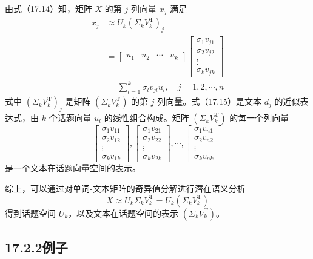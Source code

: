 \documentclass[UTF8,12pt,a4paper,fontset=fandol]{ctexart}
\begin{document}
由式（17.14）知，矩阵 $X$ 的第 $j$ 列向量 $x_j$ 满足
\begin{equation}
\begin{aligned}
x_j&\approx U_k(\Sigma_kV_k^{\mathrm{T}})_j\\
&=
\begin{bmatrix}
u_1 & u_2 & \cdots & u_k
\end{bmatrix}
\begin{bmatrix}
\sigma_1 v_{j1}\\
\sigma_2 v_{j2}\\
\vdots\\
\sigma_k v_{jk}
\end{bmatrix}\\
&=\sum_{l=1}^k \sigma_l v_{jl}u_l,\quad j=1,2,\cdots,n
\end{aligned}
\tag{17.15}
\end{equation}
式中 $(\Sigma_kV_k^{\mathrm{T}})_j$ 是矩阵 $(\Sigma_kV_k^{\mathrm{T}})$ 的第 $j$ 列向量。式（17.15）是文本 $d_j$ 的近似表达式，由 $k$ 个话题向量 $u_l$ 的线性组合构成。矩阵 $(\Sigma_kV_k^{\mathrm{T}})$ 的每一个列向量
\[
\begin{bmatrix}
\sigma_1v_{11}\\
\sigma_2v_{12}\\
\vdots\\
\sigma_kv_{1k}
\end{bmatrix},
\begin{bmatrix}
\sigma_1v_{21}\\
\sigma_2v_{22}\\
\vdots\\
\sigma_kv_{2k}
\end{bmatrix},
\cdots,
\begin{bmatrix}
\sigma_1v_{n1}\\
\sigma_2v_{n2}\\
\vdots\\
\sigma_kv_{nk}
\end{bmatrix}
\]
是一个文本在话题向量空间的表示。

综上，可以通过对单词-文本矩阵的奇异值分解进行潜在语义分析
\begin{equation}
X\approx U_k\Sigma_kV_k^{\mathrm{T}}=U_k(\Sigma_kV_k^{\mathrm{T}})
\tag{17.16}
\end{equation}
得到话题空间 $U_k$，以及文本在话题空间的表示 $(\Sigma_kV_k^{\mathrm{T}})$。

\subsection*{17.2.2\quad 例子}
\end{document}
